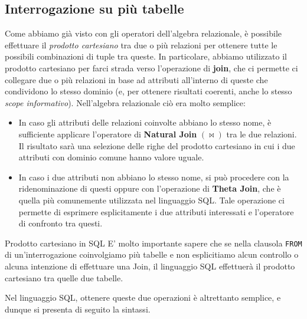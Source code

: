 \documentclass[12pt]{report}
\begin{document}
	\subsection{Interrogazione su più tabelle}
	Come abbiamo già visto con gli operatori dell'algebra relazionale, è possibile effettuare il \textit{prodotto cartesiano} tra due o più relazioni per ottenere tutte le possibili combinazioni di tuple tra queste. In particolare, abbiamo utilizzato il prodotto cartesiano per farci strada verso l'operazione di \textbf{join}, che ci permette ci collegare due o più relazioni in base ad attributi all'interno di queste che condividono lo stesso dominio (e, per ottenere risultati coerenti, anche lo stesso \textit{scope informativo}).
	Nell'algebra relazionale ciò era molto semplice:
	\begin{itemize}
		\item In caso gli attributi delle relazioni coinvolte abbiano lo stesso nome, è sufficiente applicare l'operatore di \textbf{Natural Join} $(\bowtie)$ tra le due relazioni. Il risultato sarà una selezione delle righe del prodotto cartesiano in cui i due attributi con dominio comune hanno valore uguale.
		
		\item In caso i due attributi non abbiano lo stesso nome, si può procedere con la ridenominazione di questi oppure con l'operazione di \textbf{Theta Join}, che è quella più comunemente utilizzata nel linguaggio SQL. Tale operazione ci permette di esprimere esplicitamente i due attributi interessati e l'operatore di confronto tra questi.
	\end{itemize}
	
	\begin{osservazione}{Prodotto cartesiano in SQL}{}
		E' molto importante sapere che se nella clausola \texttt{FROM} di un'interrogazione coinvolgiamo più tabelle e non esplicitiamo alcun controllo o alcuna intenzione di effettuare una Join, il linguaggio SQL effettuerà il prodotto cartesiano tra quelle due tabelle.
	\end{osservazione}
	
	Nel linguaggio SQL, ottenere queste due operazioni è altrettanto semplice, e dunque si presenta di seguito la sintassi.
	
\end{document}
